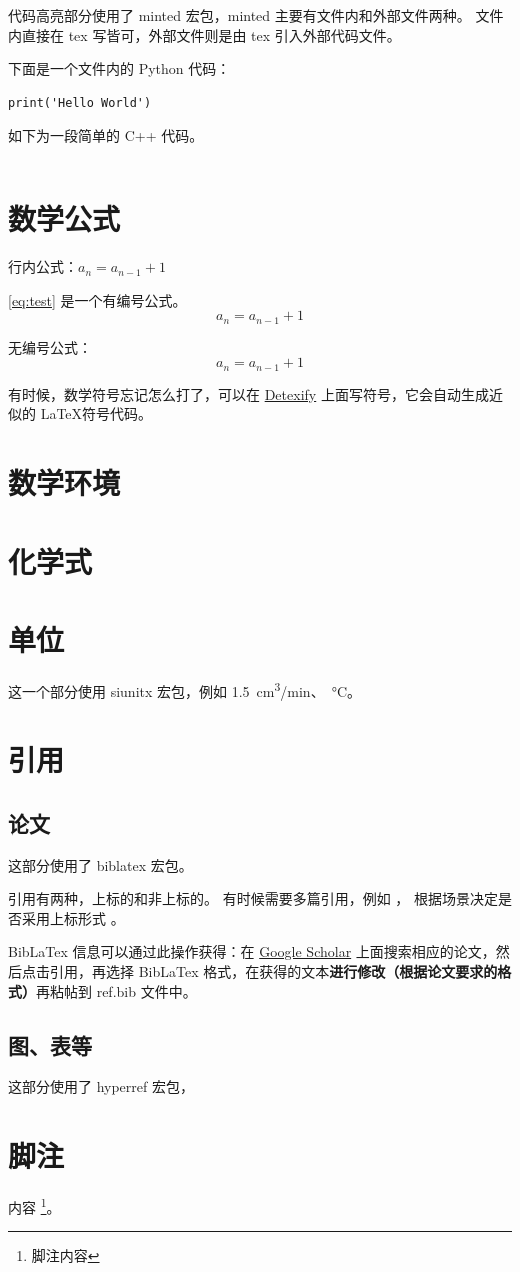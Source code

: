 代码高亮部分使用了 minted 宏包，minted 主要有文件内和外部文件两种。
文件内直接在 tex 写皆可，外部文件则是由 tex 引入外部代码文件。

下面是一个文件内的 Python 代码：
\begin{verbatim}
print('Hello World')
\end{verbatim}

如下为一段简单的 C++ 代码。
\inputminted{c++}{code/test.cpp}

\section{数学公式}

行内公式：$a_n = a_{n-1} + 1$

\autoref{eq:test} 是一个有编号公式。
\begin{equation}
    \label{eq:test}
    a_n = a_{n-1} + 1
\end{equation}

无编号公式：
$$
    a_n = a_{n-1} + 1
$$

有时候，数学符号忘记怎么打了，可以在 \href{http://detexify.kirelabs.org/classify.html}{Detexify} 上面写符号，它会自动生成近似的 \LaTeX 符号代码。

\section{数学环境}

\section{化学式}

\section{单位}

这一个部分使用 siunitx 宏包，例如 \SI{1.5}{cm^3/min}、\SI{}{\degreeCelsius}。

\section{引用}

\subsection{论文}

这部分使用了 biblatex 宏包。

引用有两种，上标的和非上标的\cite{he2016deep}。
有时候需要多篇引用，例如 \cite{he2016deep, krizhevsky2012imagenet, vaswani2017attention}，
根据场景决定是否采用上标形式 。

BibLaTex 信息可以通过此操作获得：在 \href{https://scholar.google.com}{Google Scholar} 上面搜索相应的论文，然后点击引用，再选择 BibLaTex 格式，在获得的文本\textbf{进行修改（根据论文要求的格式）}再粘帖到 ref.bib 文件中。

\subsection{图、表等}

这部分使用了 hyperref 宏包，

\section{脚注}

内容 \footnote{脚注内容}。
